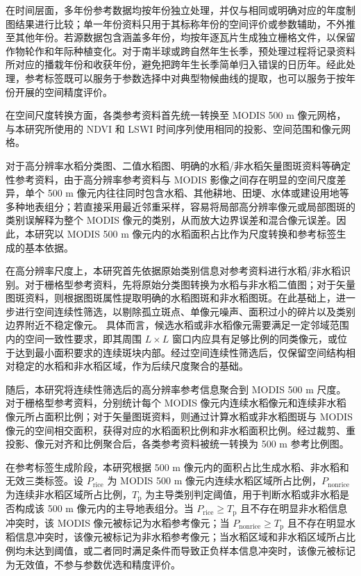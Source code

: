 在时间层面，多年份参考数据均按年份独立处理，并仅与相同或明确对应的年度制图结果进行比较；单一年份资料只用于其标称年份的空间评价或参数辅助，不外推至其他年份。若源数据包含涵盖多年份，均按年逐瓦片生成独立栅格文件，以保留作物轮作和年际种植变化。对于南半球或跨自然年生长季，预处理过程将记录资料所对应的播栽年份和收获年份，避免把跨年生长季简单归入错误的日历年。经此处理，参考标签既可以服务于参数选择中对典型物候曲线的提取，也可以服务于按年份开展的空间精度评价。

在空间尺度转换方面，各类参考资料首先统一转换至 MODIS 500 m 像元网格，与本研究所使用的 NDVI 和 LSWI 时间序列使用相同的投影、空间范围和像元网格。

对于高分辨率水稻分类图、二值水稻图、明确的水稻/非水稻矢量图斑资料等确定性参考资料，由于高分辨率参考资料与 MODIS 影像之间存在明显的空间尺度差异，单个 500 m 像元内往往同时包含水稻、其他耕地、田埂、水体或建设用地等多种地表组分；若直接采用最近邻重采样，容易将局部高分辨率像元或局部图斑的类别误解释为整个 MODIS 像元的类别，从而放大边界误差和混合像元误差。因此，本研究以 MODIS 500 m 像元内的水稻面积占比作为尺度转换和参考标签生成的基本依据。

在高分辨率尺度上，本研究首先依据原始类别信息对参考资料进行水稻/非水稻识别。对于栅格型参考资料，先将原始分类图转换为水稻与非水稻二值图；对于矢量图斑资料，则根据图斑属性提取明确的水稻图斑和非水稻图斑。在此基础上，进一步进行空间连续性筛选，以剔除孤立斑点、单像元噪声、面积过小的碎片以及类别边界附近不稳定像元。
具体而言，候选水稻或非水稻像元需要满足一定邻域范围内的空间一致性要求，即其周围 $L \times L$ 窗口内应具有足够比例的同类像元，或位于达到最小面积要求的连续斑块内部。经过空间连续性筛选后，仅保留空间结构相对稳定的水稻和非水稻区域，作为后续尺度聚合的基础。

随后，本研究将连续性筛选后的高分辨率参考信息聚合到 MODIS 500 m 尺度。对于栅格型参考资料，分别统计每个 MODIS 像元内连续水稻像元和连续非水稻像元所占面积比例；对于矢量图斑资料，则通过计算水稻或非水稻图斑与 MODIS 像元的空间相交面积，获得对应的水稻面积比例和非水稻面积比例。经过裁剪、重投影、像元对齐和比例聚合后，各类参考资料被统一转换为 500 m 参考比例图。

在参考标签生成阶段，本研究根据 500 m 像元内的面积占比生成水稻、非水稻和无效三类标签。设 $P_{\mathrm{rice}}$ 为 MODIS 500 m 像元内连续水稻区域所占比例，$P_{\mathrm{nonrice}}$ 为连续非水稻区域所占比例，$T_{\mathrm{p}}$ 为主导类别判定阈值，用于判断水稻或非水稻是否构成该 500 m 像元内的主导地表组分。当 $P_{\mathrm{rice}} \geq T_{\mathrm{p}}$ 且不存在明显非水稻信息冲突时，该 MODIS 像元被标记为水稻参考像元；当 $P_{\mathrm{nonrice}} \geq T_{\mathrm{p}}$ 且不存在明显水稻信息冲突时，该像元被标记为非水稻参考像元；当水稻区域和非水稻区域所占比例均未达到阈值，或二者同时满足条件而导致正负样本信息冲突时，该像元被标记为无效值，不参与参数优选和精度评价。

